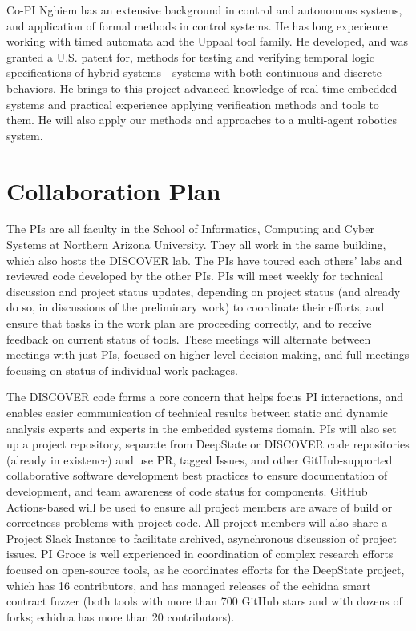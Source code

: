 \documentclass[12pt]{article}
\begin{document}
Co-PI Nghiem has an extensive background in control and autonomous systems, and application of formal methods in control systems.
He has long experience working with timed automata and the Uppaal tool family.
He developed, and was granted a U.S. patent for, methods for testing and verifying temporal logic specifications of hybrid systems---systems with both continuous and discrete behaviors.
He brings to this project advanced knowledge of real-time embedded systems and practical experience applying verification methods and tools to them.
He will also
apply our methods and approaches to a multi-agent robotics system.


\section{Collaboration Plan}

The PIs are all faculty in the School of Informatics, Computing and Cyber Systems at Northern Arizona University.  They all work in the same building, which also hosts the DISCOVER lab.  The PIs have toured each others' labs and reviewed code developed by the other PIs.  PIs will meet weekly for technical discussion and project status updates, depending on project status (and already do so, in discussions of the preliminary work) to coordinate their efforts, and ensure that tasks in the work plan are proceeding correctly, and to receive feedback on current status of tools.  These meetings will alternate between meetings with just PIs, focused on higher level decision-making, and full meetings focusing on status of individual work packages.

The DISCOVER code forms a core concern that helps focus PI interactions, and enables easier communication of technical results between static and dynamic analysis experts and experts in the embedded systems domain.  PIs will also set up a project repository, separate from DeepState or DISCOVER code repositories (already in existence) and use PR, tagged Issues, and other GitHub-supported collaborative software development best practices to ensure documentation of development, and team awareness of code status for components.  GitHub Actions-based will be used to ensure all project members are aware of build or correctness problems with project code.  All project members will also share a Project Slack Instance to facilitate archived, asynchronous discussion of project issues.
PI Groce is well experienced in coordination of complex research efforts focused on open-source tools, as he coordinates efforts for the DeepState project, which has 16 contributors, and has managed releases of the echidna smart contract fuzzer (both tools with more than 700 GitHub stars and with dozens of forks; echidna has more than 20 contributors).
\end{document}
